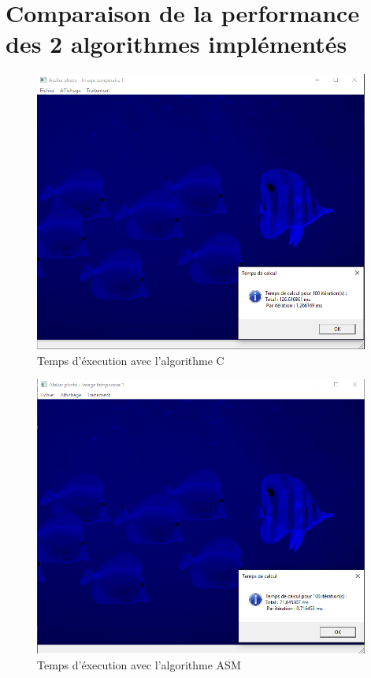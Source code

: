 \documentclass[11pt]{report}
\begin{document}
\newpage
\section{Comparaison de la performance des 2 algorithmes implémentés}

\begin{figure}[h]
\includegraphics[width=11cm]{CaptureC.PNG}
\caption{Temps d'éxecution avec l'algorithme C}
\end{figure}

\begin{figure}[h]
\includegraphics[width=11cm]{CaptureASM.PNG}
\caption{Temps d'éxecution avec l'algorithme ASM}
\end{figure}
\end{document}
